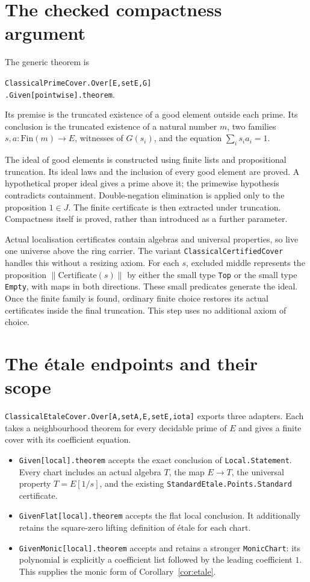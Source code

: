 \documentclass[11pt]{article}
\begin{document}
\section{The checked compactness argument}

The generic theorem is
\begin{center}
\texttt{ClassicalPrimeCover.Over[E,setE,G]}\\
\texttt{.Given[pointwise].theorem}.
\end{center}
Its premise is the truncated existence of a good element outside each
prime. Its conclusion is the truncated existence of a natural number
$m$, two families $s,a:\mathrm{Fin}(m)\to E$, witnesses of $G(s_i)$,
and the equation $\sum_i s_i a_i=1$.

The ideal of good elements is constructed using finite lists and
propositional truncation. Its ideal laws and the inclusion of every good
element are proved. A hypothetical proper ideal gives a prime above it;
the primewise hypothesis contradicts containment. Double-negation
elimination is applied only to the proposition $1\in J$. The finite
certificate is then extracted under truncation. Compactness itself is
proved, rather than introduced as a further parameter.

Actual localisation certificates contain algebras and universal
properties, so live one universe above the ring carrier. The variant
\texttt{ClassicalCertifiedCover} handles this without a resizing axiom.
For each $s$, excluded middle represents the proposition
$\|\mathrm{Certificate}(s)\|$ by either the small type \texttt{Top}
or the small type \texttt{Empty}, with maps in both directions. These
small predicates generate the ideal. Once the finite family is found,
ordinary finite choice restores its actual certificates inside the
final truncation. This step uses no additional axiom of choice.

\section{The \'etale endpoints and their scope}

\texttt{ClassicalEtaleCover.Over[A,setA,E,setE,iota]} exports three
adapters. Each takes a neighbourhood theorem for every decidable prime
of $E$ and gives a finite cover with its coefficient equation.
\begin{itemize}
\item \texttt{Given[local].theorem} accepts the exact conclusion of
\texttt{Local.Statement}. Every chart includes an actual algebra $T$,
the map $E\to T$, the universal property $T=E[1/s]$, and the existing
\texttt{StandardEtale.Points.Standard} certificate.
\item \texttt{GivenFlat[local].theorem} accepts the flat local conclusion.
It additionally retains the square-zero lifting definition of \'etale
for each chart.
\item \texttt{GivenMonic[local].theorem} accepts and retains a stronger
\texttt{MonicChart}: its polynomial is explicitly a coefficient list
followed by the leading coefficient $1$. This supplies the monic form
of Corollary~\ref{cor:etale}.
\end{itemize}
\end{document}
